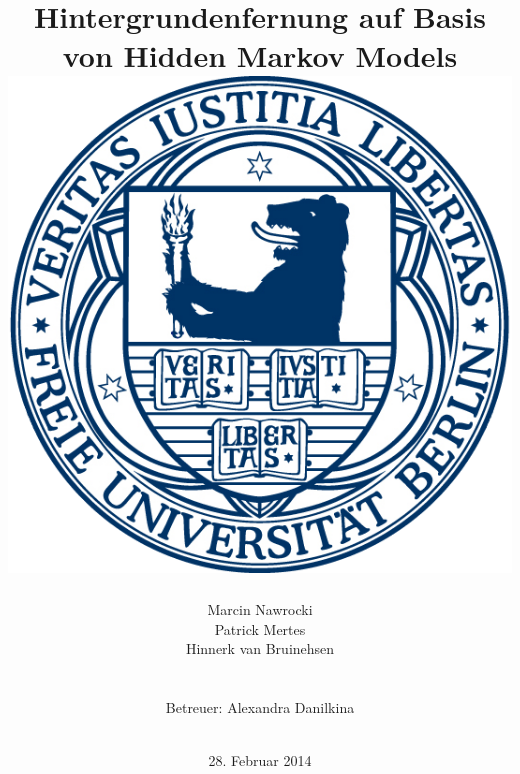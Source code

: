 \documentclass[11pt,a4paper,ngerman,bibtotoc]{scrartcl}
\title{
	\vspace{10mm}
	Hintergrundenfernung auf Basis von Hidden Markov Models\\
	\vspace{10mm}
	\includegraphics{bilder/fu_logo.png}	%
	\vspace{10mm}
}
\author{Marcin Nawrocki\\Patrick Mertes\\Hinnerk van Bruinehsen\\\\\\Betreuer: Alexandra Danilkina\\\\}
\date{28. Februar 2014}
\begin{document}
\maketitle\thispagestyle{empty}
\newpage
\tableofcontents
\listoffigures	%
\newpage







\nocite{lamarre2002tracking}

\newpage

\printbibliography
\end{document}
